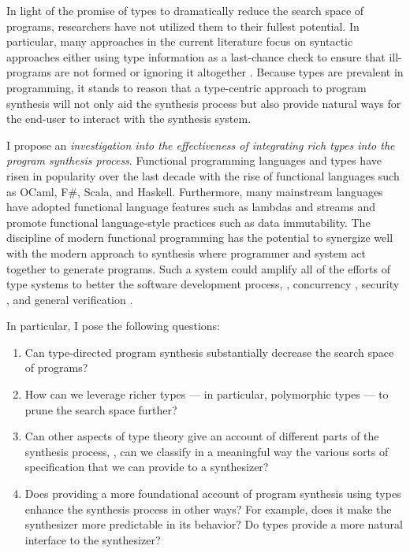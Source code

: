 In light of the promise of types to dramatically reduce the search space of
programs, researchers have not utilized them to their fullest potential.  In
particular, many approaches in the current literature \cite{alur-fmcad-2013}
focus on syntactic approaches either using type information as a last-chance
check to ensure that ill-programs are not formed or ignoring it altogether
\cite{singh-pldi-2013}.  Because types are prevalent in programming, it stands
to reason that a type-centric approach to program synthesis will not only aid
the synthesis process but also provide natural ways for the end-user to interact
with the synthesis system.

I propose an \emph{investigation into the effectiveness of integrating rich
types into the program synthesis process}.  Functional programming languages and
types have risen in popularity over the last decade with the rise of
functional languages such as OCaml, F\#, Scala, and Haskell.
Furthermore, many mainstream languages have adopted functional language features
such as lambdas and streams and promote functional language-style practices such
as data immutability.  The discipline of modern functional programming has the
potential to synergize well with the modern approach to synthesis where
programmer and system act together to generate programs.  Such a system could
amplify all of the efforts of type systems to better the software development
process, \eg, concurrency \cite{mazurak-icfp-2010}, security
\cite{jia-icfp-2008}, and general verification \cite{mckinna-popl-2006,
rondon-popl-2010}.

In particular, I pose the following questions:
\begin{enumerate}
\item Can type-directed program synthesis substantially decrease the search
space of programs?
\item How can we leverage richer types --- in particular, polymorphic types ---
to prune the search space further?
\item Can other aspects of type theory give an account of different parts of the
synthesis process, \eg, can we classify in a meaningful way the various sorts of
specification that we can provide to a synthesizer?
\item Does providing a more foundational account of program synthesis using
types enhance the synthesis process in other ways?  For example, does it make
the synthesizer more predictable in its behavior?  Do types provide a more
natural interface to the synthesizer?
\end{enumerate}

